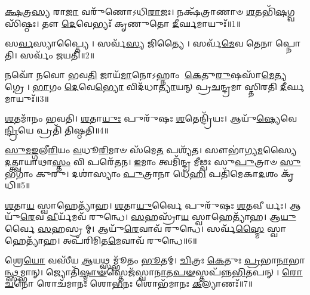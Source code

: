 
\-\ul{𑌕𑍍𑌷}\-𑌤𑍍𑌰\-\ul{𑌸𑍍𑌯} 𑌰𑌾\-\ul{𑌜𑌾} 𑌵𑌰𑍁᳴𑌣𑍋𑌽𑌧𑌿\-\ul{𑌰𑌾}\-𑌜𑌃। 𑌨𑌕𑍍𑌷᳴𑌤𑍍𑌰𑌾𑌣𑌾𑍞 \ul{𑌶}\-𑌤𑌭𑌿᳴\-\ul{𑌷}\-𑌗𑍍𑌵𑌸𑌿᳴𑌷𑍍𑌠𑌃। 𑌤𑍗 \ul{𑌦𑍇}\-𑌵𑍇𑌭𑍍𑌯𑌃᳴ 𑌕𑍃𑌣𑍁𑌤𑍋 \ul{𑌦𑍀}\-𑌰𑍍𑌘𑌮𑌾𑌯𑍁𑌃᳴॥1॥

𑌸\-\ul{𑌰𑍍𑌵}\-𑌸𑍍𑌯𑌾𑌪𑍍𑌤𑍍𑌯𑍈। 𑌸𑌰𑍍𑌵᳴\-\ul{𑌸𑍍𑌯} 𑌜𑌿𑌤𑍍𑌯𑍈। 𑌸𑌰𑍍𑌵᳴\-\ul{𑌮𑍇}\-𑌵 𑌤𑍇𑌨𑌾𑌪𑍍𑌨𑍋𑌤𑌿। 𑌸𑌰𑍍𑌵𑌂᳴ 𑌜𑌯𑌤𑌿॥2॥

𑌨𑌵𑍋᳴ 𑌨𑌵𑍋 𑌭𑌵\-\ul{𑌤𑌿} 𑌜𑌾𑌯᳴\-\ul{𑌮𑌾}\-𑌨𑍋𑌽𑌹𑍍𑌨𑌾𑌂 \ul{𑌕𑍇}\-𑌤𑍁\-\ul{𑌰𑍁}\-𑌷𑌸𑌾᳴\-\ul{𑌮𑍇}\-𑌤𑍍𑌯𑌗𑍍𑌰𑍇।
\-\ul{𑌭𑌾}\-𑌗𑌂 \ul{𑌦𑍇}\-𑌵𑍇\-\ul{𑌭𑍍𑌯𑍋} 𑌵𑌿𑌦᳴𑌧𑌾\-\ul{𑌤𑍍𑌯𑌾}\-𑌯𑌨𑍍 𑌪𑍍𑌰\-\ul{𑌚}\-𑌨𑍍𑌦𑍍𑌰𑌮𑌾𑌸𑍍𑌤𑌿𑌰𑌤𑌿 \ul{𑌦𑍀}\-𑌰𑍍𑌘𑌮𑌾𑌯𑍁𑌃᳴॥3॥

\-\ul{𑌶}\-𑌤𑌮𑌾᳴𑌨𑌂 𑌭𑌵𑌤𑌿। \ul{𑌶}\-𑌤𑌾\-\ul{𑌯𑍁𑌃} 𑌪𑍁𑌰𑍁᳴𑌷𑌃 \ul{𑌶}\-𑌤𑍇𑌨𑍍𑌦𑍍𑌰𑌿᳴𑌯𑌃। 𑌆𑌯𑍁᳴\-\ul{𑌷𑍍𑌯𑍇}\-𑌵𑍇\-\ul{𑌨𑍍𑌦𑍍𑌰𑌿}\-𑌯𑍇 𑌪𑍍𑌰𑌤𑌿᳴ 𑌤𑌿𑌷𑍍𑌠𑌤𑌿॥4॥

\-\ul{𑌸𑍁}\-\-\ul{𑌮}\-\-\ul{𑌙𑍍𑌗}\-𑌲𑍀\-\ul{𑌰𑌿}\-𑌯𑌂 \ul{𑌵}\-𑌧𑍂\-\ul{𑌰𑌿}\-𑌮𑌾𑍞 𑌸᳴𑌮𑍇\-\ul{𑌤} 𑌪𑌶𑍍𑌯᳴𑌤। 
𑌸𑍗𑌭𑌾॑𑌗𑍍𑌯\-\ul{𑌮}\-𑌸𑍍𑌯𑍈 \ul{𑌦}\-𑌤𑍍𑌤𑍍𑌵𑌾𑌯𑌾𑌥𑌾\-\ul{𑌸𑍍𑌤𑌂} 𑌵𑌿 𑌪𑌰𑍇᳴𑌤𑌨। 
\-\ul{𑌇}\-𑌮𑌾𑌂 𑌤𑍍𑌵𑌮𑌿᳴𑌨𑍍𑌦𑍍𑌰 𑌮𑍀𑌢𑍍𑌵𑌃 𑌸𑍁\-\ul{𑌪𑍁}\-𑌤𑍍𑌰𑌾𑍞 \ul{𑌸𑍁}\-𑌭𑌗𑌾𑌂॑ 𑌕𑍁𑌰𑍁। 
𑌦𑌶𑌾॑𑌸𑍍𑌯𑌾𑌂 \ul{𑌪𑍁}\-𑌤𑍍𑌰𑌾𑌨𑌾 𑌧𑍇᳴\-\ul{𑌹𑌿} 𑌪𑌤𑌿᳴𑌮𑍇𑌕𑌾\-\ul{𑌦}\-𑌶𑌂 𑌕𑍃᳴𑌧𑌿॥5॥ 


\-\ul{𑌶}\-𑌤𑌾\-\ul{𑌯} 𑌸𑍍𑌵𑌾𑌹𑍇𑌤𑍍𑌯𑌾᳴𑌹। \ul{𑌶}\-𑌤𑌾\-\ul{𑌯𑍁}\-𑌰𑍍𑌵𑍈 𑌪𑍁𑌰𑍁᳴𑌷𑌃 \ul{𑌶}\-𑌤𑌵𑍀𑌰𑍍𑌯𑌃। 𑌆𑌯𑍁᳴\-\ul{𑌰𑍇}\-𑌵 \ul{𑌵𑍀}\-𑌰𑍍𑌯᳴𑌮𑌵᳴ 𑌰𑍁𑌨𑍍𑌧𑍇। \ul{𑌸}\-𑌹𑌸𑍍𑌰𑌾᳴\-\ul{𑌯} 𑌸𑍍𑌵𑌾𑌹𑍇𑌤𑍍𑌯𑌾᳴𑌹। 𑌆\-\ul{𑌯𑍁}\-𑌰𑍍𑌵𑍈 \ul{𑌸}\-𑌹𑌸𑍍𑌰𑌮𑍍। 𑌆𑌯𑍁᳴\-\ul{𑌰𑍇}\-𑌵𑌾𑌵᳴ 𑌰𑍁𑌨𑍍𑌧𑍇। 𑌸𑌰𑍍𑌵᳴\-\ul{𑌸𑍍𑌮𑍈} 𑌸𑍍𑌵𑌾𑌹𑍇𑌤𑍍𑌯𑌾᳴𑌹। 𑌅𑌪᳴𑌰𑌿𑌮𑌿𑌤\-\ul{𑌮𑍇}\-𑌵𑌾𑌵᳴ 𑌰𑍁𑌨𑍍𑌧𑍇॥6॥


𑌶𑍍𑌰𑍇\-\ul{𑌯𑍋} 𑌵𑌸𑍀᳴𑌯 \ul{𑌆}\-𑌯𑌥𑍍𑌸𑌮𑍍𑌭𑍂᳴𑌤𑌂 \ul{𑌭𑍂}\-𑌤𑌮𑍍। 
\-\ul{𑌚𑌿}\-𑌤𑍍𑌰𑌃 \ul{𑌕𑍇}\-𑌤𑍁𑌃 \ul{𑌪𑍍𑌰}\-𑌭𑌾\-\ul{𑌨𑌾}\-𑌭𑌾\-\ul{𑌨𑍍𑌥𑍍𑌸}\-𑌮𑍍𑌭𑌾𑌨𑍍। 
𑌜𑍍𑌯𑍋𑌤𑌿᳴\-\ul{𑌷𑍍𑌮𑌾}\-\-\ul{𑍟}\-𑌸𑍍𑌤𑍇𑌜᳴𑌸𑍍𑌵𑌾\-\ul{𑌨𑌾}\-𑌤\-\ul{𑌪}\-\-\ul{𑍟}\-𑌸𑍍𑌤𑌪᳴𑌨𑍍𑌨\-\ul{𑌭𑌿}\-\-𑌤𑌪𑌨𑍍। 
\-\ul{𑌰𑍋}\-\-\ul{𑌚}\-𑌨𑍋 𑌰𑍋𑌚᳴𑌮𑌾𑌨𑌃 𑌶𑍋\-\ul{𑌭}\-𑌨𑌃 𑌶𑍋𑌭᳴𑌮𑌾𑌨𑌃 \ul{𑌕}\-𑌲𑍍𑌯𑌾𑌣𑌃᳴॥7॥

